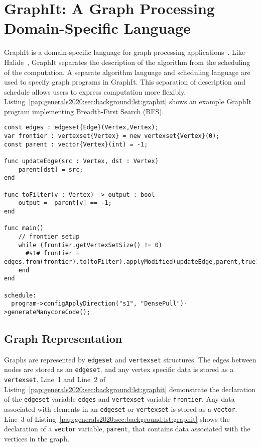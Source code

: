 
\section{GraphIt: A Graph Processing Domain-Specific Language}\label{pap:generals2020:sec:graphit}

GraphIt is a domain-specific language for graph processing applications~\citep{zhang2018graphit}.
Like Halide~\citep{ragan2013halide}, GraphIt separates the description of the algorithm from the scheduling of the computation. A separate algorithm language and scheduling language are used to specify graph programs in GraphIt. This separation of description and schedule allows users to express computation more flexibly.
Listing~\ref{pap:generals2020:sec:background:lst:graphit} shows an example GraphIt program implementing Breadth-First Search (BFS).
\hfill
\break 
\begin{lstlisting}[language=graphit, 
                   caption=GraphIt code for Breadth-First Search (BFS),
                   label=pap:generals2020:sec:background:lst:graphit]
const edges : edgeset{Edge}(Vertex,Vertex);
var frontier : vertexset{Vertex} = new vertexset{Vertex}(0);
const parent : vector{Vertex}(int) = -1;

func updateEdge(src : Vertex, dst : Vertex)
    parent[dst] = src;
end

func toFilter(v : Vertex) -> output : bool
    output =  parent[v] == -1;
end

func main()
    // frontier setup
    while (frontier.getVertexSetSize() != 0)
      #s1# frontier = edges.from(frontier).to(toFilter).applyModified(updateEdge,parent,true);
    end
end

schedule:
  program->configApplyDirection("s1", "DensePull")->generateManycoreCode();
\end{lstlisting}

\subsection{Graph Representation}
Graphs are represented by \lstinline[language=graphit]{edgeset} and \lstinline[language=graphit]{vertexset} structures.
The edges between nodes are stored as an \lstinline[language=graphit]{edgeset}, and any vertex specific data is stored as a \lstinline[language=graphit]{vertexset}.
Line~1 and Line~2 of Listing~\ref{pap:generals2020:sec:background:lst:graphit} demonstrate the declaration of the \lstinline[language=graphit]{edgeset} variable \lstinline[language=graphit]{edges} and  \lstinline[language=graphit]{vertexset} variable \lstinline[language=graphit]{frontier}. 
Any data associated with elements in an \lstinline[language=graphit]{edgeset} or \lstinline[language=graphit]{vertexset} is stored as a \lstinline[language=graphit]{vector}.
Line~3 of Listing~\ref{pap:generals2020:sec:background:lst:graphit} shows the declaration of a \lstinline[language=graphit]{vector} variable, \lstinline[language=graphit]{parent}, that contains data associated with the vertices in the graph.

